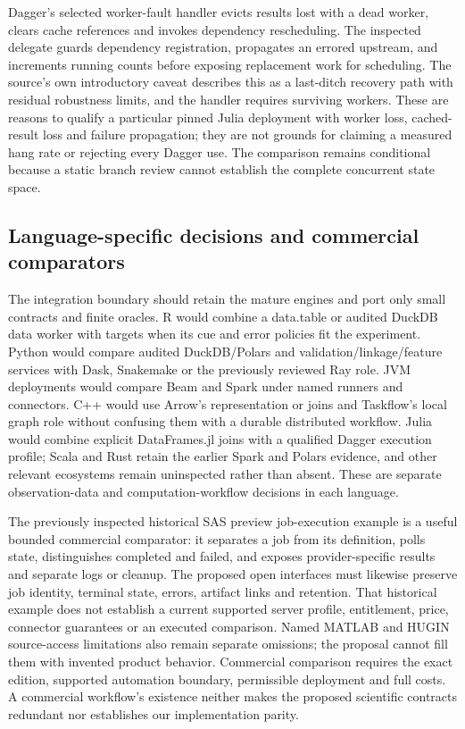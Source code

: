 Dagger's selected worker-fault handler evicts results lost with a dead worker, clears cache references and invokes dependency rescheduling. The inspected delegate guards dependency registration, propagates an errored upstream, and increments running counts before exposing replacement work for scheduling. The source's own introductory caveat describes this as a last-ditch recovery path with residual robustness limits, and the handler requires surviving workers. These are reasons to qualify a particular pinned Julia deployment with worker loss, cached-result loss and failure propagation; they are not grounds for claiming a measured hang rate or rejecting every Dagger use. The comparison remains conditional because a static branch review cannot establish the complete concurrent state space.~\citep{exec25_dww_dagger}

\subsection{Language-specific decisions and commercial comparators}

The integration boundary should retain the mature engines and port only small contracts and finite oracles. R would combine a data.table or audited DuckDB data worker with targets when its cue and error policies fit the experiment. Python would compare audited DuckDB/Polars and validation/linkage/feature services with Dask, Snakemake or the previously reviewed Ray role. JVM deployments would compare Beam and Spark under named runners and connectors. C++ would use Arrow's representation or joins and Taskflow's local graph role without confusing them with a durable distributed workflow. Julia would combine explicit DataFrames.jl joins with a qualified Dagger execution profile; Scala and Rust retain the earlier Spark and Polars evidence, and other relevant ecosystems remain uninspected rather than absent. These are separate observation-data and computation-workflow decisions in each language.~\citep{exec25_dww_datatable,exec25_dww_targets,exec25_dww_dask,exec25_dww_snakemake,exec25_dww_beam,exec25_dww_arrow,exec25_dww_taskflow,exec25_dww_dataframes,exec25_dww_dagger,exec25_otm_spark,exec25_otm_polars,exec25_dww_choice}

The previously inspected historical SAS preview job-execution example is a useful bounded commercial comparator: it separates a job from its definition, polls state, distinguishes completed and failed, and exposes provider-specific results and separate logs or cleanup. The proposed open interfaces must likewise preserve job identity, terminal state, errors, artifact links and retention. That historical example does not establish a current supported server profile, entitlement, price, connector guarantees or an executed comparison. Named MATLAB and HUGIN source-access limitations also remain separate omissions; the proposal cannot fill them with invented product behavior. Commercial comparison requires the exact edition, supported automation boundary, permissible deployment and full costs. A commercial workflow's existence neither makes the proposed scientific contracts redundant nor establishes our implementation parity.~\citep{exec24_workflow_contracts_sas,exec25_dww_choice}

